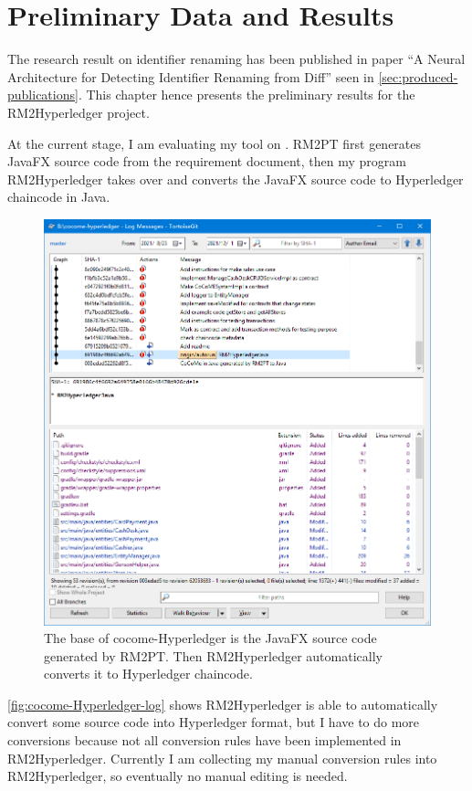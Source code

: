 \chapter{Preliminary Data and Results}

The research result on identifier renaming has been published in paper ``A Neural Architecture for Detecting Identifier Renaming from Diff'' seen in \autoref{sec:produced-publications}.
This chapter hence presents the preliminary results for the RM2Hyperledger project.

At the current stage, I am evaluating my tool on \cocome. RM2PT first generates JavaFX source code from the requirement document, then my program RM2Hyperledger takes over and converts the JavaFX source code to Hyperledger chaincode in Java.

\begin{figure}[ht]
\centering
\includegraphics[width=0.9\linewidth]{cocome-Hyperledger-log}
\caption{The base of cocome-Hyperledger is the JavaFX source code generated by RM2PT. Then RM2Hyperledger automatically converts it to Hyperledger chaincode.}
\label{fig:cocome-Hyperledger-log}
\end{figure}

\autoref{fig:cocome-Hyperledger-log} shows RM2Hyperledger is able to automatically convert some source code into Hyperledger format, but I have to do more conversions because not all conversion rules have been implemented in RM2Hyperledger. Currently I am collecting my manual conversion rules into RM2Hyperledger, so eventually no manual editing is needed.

